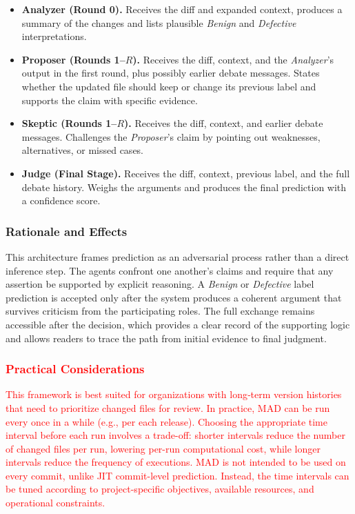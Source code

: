 \documentclass[authoryear,final,5p,times,twocolumn]{elsarticle}
\theoremstyle{plain}
\begin{document}
\begin{itemize}
    \item \textbf{Analyzer (Round 0).}  
    Receives the diff and expanded context, produces a summary of the changes and lists plausible \emph{Benign} and \emph{Defective} interpretations.

    \item \textbf{Proposer (Rounds 1--$R$).}  
    Receives the diff, context, and the \emph{Analyzer}’s output in the first round, plus possibly earlier debate messages.
    States whether the updated file should keep or change its previous label and supports the claim with specific evidence.

    \item \textbf{Skeptic (Rounds 1--$R$).}  
    Receives the diff, context, and earlier debate messages.  
    Challenges the \emph{Proposer}’s claim by pointing out weaknesses, alternatives, or missed cases.

    \item \textbf{Judge (Final Stage).}  
    Receives the diff, context, previous label, and the full debate history.  
    Weighs the arguments and produces the final prediction with a confidence score.
\end{itemize}

\subsubsection{Rationale and Effects}
This architecture frames prediction as an adversarial process rather than a direct inference step. The agents confront one another's claims and require that any assertion be supported by explicit reasoning. A \emph{Benign} or \emph{Defective} label prediction is accepted only after the system produces a 
coherent argument that survives criticism from the participating roles. The full exchange remains accessible after the decision, which provides a clear record of the supporting logic and allows readers to trace the path from initial evidence to final judgment.

\subsubsection{\textcolor{red}{Practical Considerations}}
\textcolor{red}{
This framework is best suited for organizations with long‑term version histories that need to prioritize changed files for review. In practice, MAD can be run every once in a while (e.g., per each release). Choosing the appropriate time interval before each run involves a trade-off: shorter intervals reduce the number of changed files per run, lowering per-run computational cost, while longer intervals reduce the frequency of executions. MAD is not intended to be used on every commit, unlike JIT commit-level prediction. Instead, the time intervals can be tuned according to project-specific objectives, available resources, and operational constraints.
}
\end{document}
